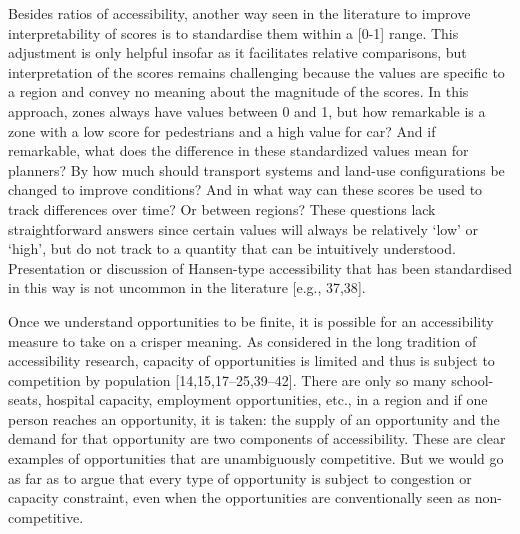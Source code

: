 \documentclass[10pt,letterpaper]{article}
\begin{document}
Besides ratios of accessibility, another way seen in the literature to
improve interpretability of scores is to standardise them within a
{[}0-1{]} range. This adjustment is only helpful insofar as it
facilitates relative comparisons, but interpretation of the scores
remains challenging because the values are specific to a region and
convey no meaning about the magnitude of the scores. In this approach,
zones always have values between 0 and 1, but how remarkable is a zone
with a low score for pedestrians and a high value for car? And if
remarkable, what does the difference in these standardized values mean
for planners? By how much should transport systems and land-use
configurations be changed to improve conditions? And in what way can
these scores be used to track differences over time? Or between regions?
These questions lack straightforward answers since certain values will
always be relatively `low' or `high', but do not track to a quantity
that can be intuitively understood. Presentation or discussion of
Hansen-type accessibility that has been standardised in this way is not
uncommon in the literature {[}e.g., 37,38{]}.

Once we understand opportunities to be finite, it is possible for an
accessibility measure to take on a crisper meaning. As considered in the
long tradition of accessibility research, capacity of opportunities is
limited and thus is subject to competition by population
{[}14,15,17--25,39--42{]}. There are only so many school-seats, hospital
capacity, employment opportunities, etc., in a region and if one person
reaches an opportunity, it is taken: the supply of an opportunity and
the demand for that opportunity are two components of accessibility.
These are clear examples of opportunities that are unambiguously
competitive. But we would go as far as to argue that every type of
opportunity is subject to congestion or capacity constraint, even when
the opportunities are conventionally seen as non-competitive.
\end{document}
